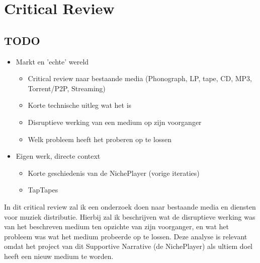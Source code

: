\section{Critical Review}
\captionsetup[figure]{font=small,labelfont=bf}

\subsection*{TODO}

\begin{itemize}
    \item Markt en 'echte' wereld
    \begin{itemize}
        \item Critical review naar bestaande media (Phonograph, LP, tape, CD, MP3, Torrent/P2P, Streaming)
        \item Korte technische uitleg wat het is
        \item Disruptieve werking van een medium op zijn voorganger
        \item Welk probleem heeft het proberen op te lossen
    \end{itemize}
    \item Eigen werk, directe context
    \begin{itemize}
        \item Korte geschiedenis van de NichePlayer (vorige iteraties)
        \item TapTapes
    \end{itemize}
\end{itemize}

In dit critical review zal ik een onderzoek doen naar bestaande media en diensten voor muziek distributie. Hierbij zal ik beschrijven wat de disruptieve werking was van het beschreven medium ten opzichte van zijn voorganger, en wat het probleem was wat het medium probeerde op te lossen. Deze analyse is relevant omdat het project van dit Supportive Narrative (de NichePlayer) als ultiem doel heeft een nieuw medium te worden.

